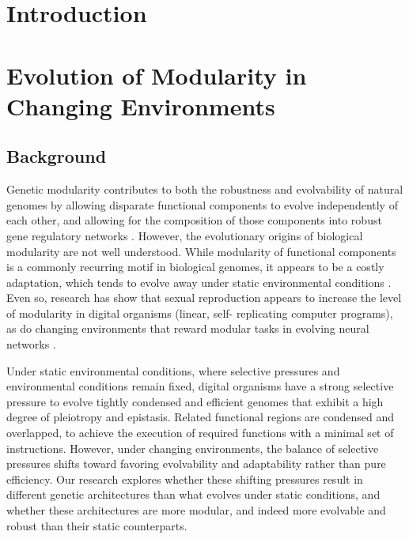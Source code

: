 \section{Introduction}
\section{Evolution of Modularity in Changing Environments}
\subsection{Background}
Genetic modularity contributes to both the robustness and evolvability of natural genomes by allowing disparate functional components to evolve independently of each other, and allowing for the composition of those components into robust gene regulatory networks \cite{Hartwell99}. However, the evolutionary origins of biological modularity are not well understood. While modularity of functional components is a commonly recurring motif in biological genomes, it appears to be a costly adaptation, which tends to evolve away under static environmental conditions \cite{Kashtan05}. Even so, research has show that sexual reproduction appears to increase the level of modularity in digital organisms (linear, self- replicating computer programs), as do changing environments that reward modular tasks in evolving neural networks \cite{Kashtan05}.

Under static environmental conditions, where selective pressures and environmental conditions remain fixed, digital organisms have a strong selective pressure to evolve tightly condensed and efficient genomes that exhibit a high degree of pleiotropy and epistasis. Related functional regions are condensed and overlapped, to achieve the execution of required functions with a minimal set of instructions.  However, under changing environments, the balance of selective pressures shifts toward favoring evolvability and adaptability rather than pure efficiency. Our research explores whether these shifting pressures result in different genetic architectures than what evolves under static conditions, and whether these architectures are more modular, and indeed more evolvable and robust than their static counterparts.
